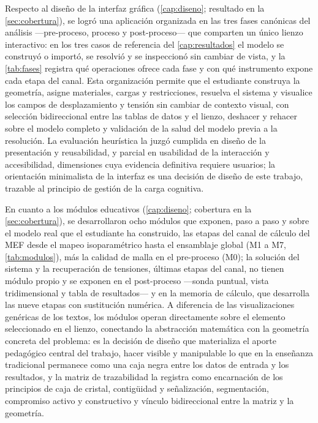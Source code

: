 Respecto al diseño de la interfaz gráfica (\autoref{cap:diseno}; resultado en la \autoref{sec:cobertura}), se logró una aplicación organizada en las tres fases canónicas del análisis —pre-proceso, proceso y post-proceso— que comparten un único lienzo interactivo: en los tres casos de referencia del \autoref{cap:resultados} el modelo se construyó o importó, se resolvió y se inspeccionó sin cambiar de vista, y la \autoref{tab:fases} registra qué operaciones ofrece cada fase y con qué instrumento expone cada etapa del canal. Esta organización permite que el estudiante construya la geometría, asigne materiales, cargas y restricciones, resuelva el sistema y visualice los campos de desplazamiento y tensión sin cambiar de contexto visual, con selección bidireccional entre las tablas de datos y el lienzo, deshacer y rehacer sobre el modelo completo y validación de la salud del modelo previa a la resolución. La evaluación heurística la juzgó cumplida en diseño de la presentación y reusabilidad, y parcial en usabilidad de la interacción y accesibilidad, dimensiones cuya evidencia definitiva requiere usuarios; la orientación minimalista de la interfaz es una decisión de diseño de este trabajo, trazable al principio de gestión de la carga cognitiva.

En cuanto a los módulos educativos (\autoref{cap:diseno}; cobertura en la \autoref{sec:cobertura}), se desarrollaron ocho módulos que exponen, paso a paso y sobre el modelo real que el estudiante ha construido, las etapas del canal de cálculo del MEF desde el mapeo isoparamétrico hasta el ensamblaje global (M1 a M7, \autoref{tab:modulos}), más la calidad de malla en el pre-proceso (M0); la solución del sistema y la recuperación de tensiones, últimas etapas del canal, no tienen módulo propio y se exponen en el post-proceso —sonda puntual, vista tridimensional y tabla de resultados— y en la memoria de cálculo, que desarrolla las nueve etapas con sustitución numérica. A diferencia de las visualizaciones genéricas de los textos, los módulos operan directamente sobre el elemento seleccionado en el lienzo, conectando la abstracción matemática con la geometría concreta del problema: es la decisión de diseño que materializa el aporte pedagógico central del trabajo, hacer visible y manipulable lo que en la enseñanza tradicional permanece como una caja negra entre los datos de entrada y los resultados, y la matriz de trazabilidad la registra como encarnación de los principios de caja de cristal, contigüidad y señalización, segmentación, compromiso activo y constructivo y vínculo bidireccional entre la matriz y la geometría.

